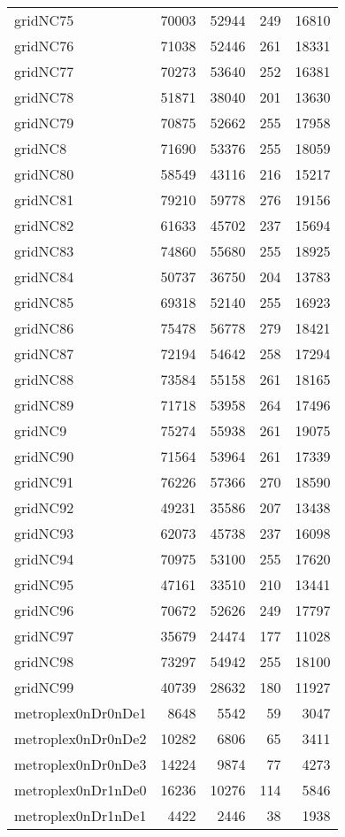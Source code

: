 \begin{tabular}{lrrrr}
gridNC75 & 70003 & 52944 & 249 & 16810 \\
gridNC76 & 71038 & 52446 & 261 & 18331 \\
gridNC77 & 70273 & 53640 & 252 & 16381 \\
gridNC78 & 51871 & 38040 & 201 & 13630 \\
gridNC79 & 70875 & 52662 & 255 & 17958 \\
gridNC8 & 71690 & 53376 & 255 & 18059 \\
gridNC80 & 58549 & 43116 & 216 & 15217 \\
gridNC81 & 79210 & 59778 & 276 & 19156 \\
gridNC82 & 61633 & 45702 & 237 & 15694 \\
gridNC83 & 74860 & 55680 & 255 & 18925 \\
gridNC84 & 50737 & 36750 & 204 & 13783 \\
gridNC85 & 69318 & 52140 & 255 & 16923 \\
gridNC86 & 75478 & 56778 & 279 & 18421 \\
gridNC87 & 72194 & 54642 & 258 & 17294 \\
gridNC88 & 73584 & 55158 & 261 & 18165 \\
gridNC89 & 71718 & 53958 & 264 & 17496 \\
gridNC9 & 75274 & 55938 & 261 & 19075 \\
gridNC90 & 71564 & 53964 & 261 & 17339 \\
gridNC91 & 76226 & 57366 & 270 & 18590 \\
gridNC92 & 49231 & 35586 & 207 & 13438 \\
gridNC93 & 62073 & 45738 & 237 & 16098 \\
gridNC94 & 70975 & 53100 & 255 & 17620 \\
gridNC95 & 47161 & 33510 & 210 & 13441 \\
gridNC96 & 70672 & 52626 & 249 & 17797 \\
gridNC97 & 35679 & 24474 & 177 & 11028 \\
gridNC98 & 73297 & 54942 & 255 & 18100 \\
gridNC99 & 40739 & 28632 & 180 & 11927 \\
metroplex0nDr0nDe1 & 8648 & 5542 & 59 & 3047 \\
metroplex0nDr0nDe2 & 10282 & 6806 & 65 & 3411 \\
metroplex0nDr0nDe3 & 14224 & 9874 & 77 & 4273 \\
metroplex0nDr1nDe0 & 16236 & 10276 & 114 & 5846 \\
metroplex0nDr1nDe1 & 4422 & 2446 & 38 & 1938 \\

\end{tabular}
